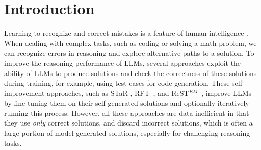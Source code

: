 

\section{Introduction}
\label{intro}


Learning to recognize and correct mistakes is a feature of human intelligence \citep{metcalfe2017learning}. When dealing with complex tasks, such as coding or solving a math problem, we can recognize errors in reasoning and explore alternative paths to a solution. To improve the reasoning performance of LLMs, several approaches exploit the ability of LLMs to produce solutions and check the correctness of these solutions during training, for example, using test cases for code generation. These self-improvement approaches, such as STaR \cite{DBLP:conf/nips/ZelikmanWMG22},  RFT~\citep{yuan2023scaling}, and ReST$^{EM}$~\citep{singh2023human}, improve LLMs by fine-tuning them on their self-generated solutions and optionally iteratively running this process.
However, all these approaches are data-inefficient in that they use \emph{only} correct solutions, and discard incorrect solutions, which is often a large portion of model-generated solutions, especially for challenging reasoning tasks. 




